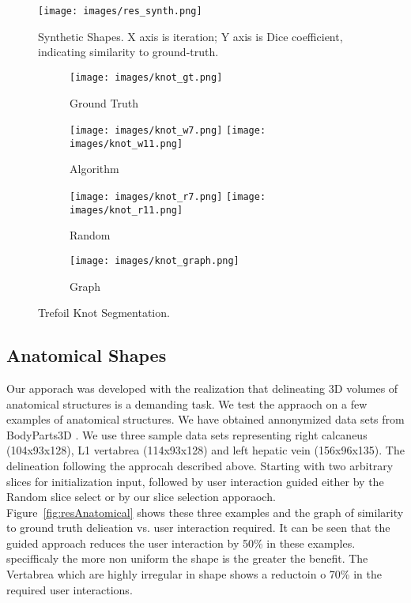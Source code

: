 \begin{figure}[htb]
\centering
  \texttt{[image: images/res\_synth.png]}
  \caption[Synthetic Shapes]{
  Synthetic Shapes.
  X axis is iteration; Y axis is Dice coefficient, indicating similarity to ground-truth.}\label{fig:resSynthImage}
\end{figure}

\begin{figure}[htb]
\centering
	\begin{subfigure}[b]{0.25\textwidth}
  \texttt{[image: images/knot\_gt.png]}  
  \caption{Ground Truth}\label{fig:knot_gt}
	\end{subfigure}
  \begin{subfigure}[b]{0.25\textwidth}
  \texttt{[image: images/knot\_w7.png]}
  \texttt{[image: images/knot\_w11.png]}
  \caption{Algorithm}\label{fig:knot_algo}
  \end{subfigure}  
  \begin{subfigure}[b]{0.25\textwidth}
  \texttt{[image: images/knot\_r7.png]}
  \texttt{[image: images/knot\_r11.png]}
  \caption{Random}\label{fig:knot_random}
  \end{subfigure}
  \begin{subfigure}[b]{0.25\textwidth}  
  \texttt{[image: images/knot\_graph.png]}
  \caption{Graph}\label{fig:knot_graph}
  \end{subfigure}
\iffalse
\fi
  \caption[Trefoil Knot Segmentation]{
  Trefoil Knot Segmentation.
  }\label{fig:knot}
\end{figure}

\subsection{Anatomical Shapes}

Our apporach was developed with the realization that delineating 3D volumes of anatomical structures is a demanding task. We test the appraoch on a few examples of anatomical structures. We have obtained annonymized data sets from BodyParts3D \cite{MitsuhashiFTKTO09}.
We use three sample data sets representing right calcaneus (104x93x128), L1 vertabrea (114x93x128) and left hepatic vein (156x96x135). The delineation following the approcah described above. Starting with two arbitrary slices for initialization input, followed by user interaction guided either by the Random slice select or by our slice selection apporaoch. Figure~\ref{fig:resAnatomical} shows these three examples and the graph of similarity to ground truth delieation vs. user interaction required. It can be seen that the guided approach reduces the user interaction by 50\% in these examples. specifficaly the more non uniform the shape is the greater the benefit. The Vertabrea which are highly irregular in shape shows a reductoin o 70\% in the required user interactions.

